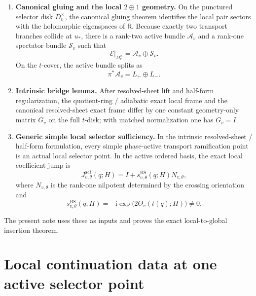 \documentclass[11pt]{article}
\numberwithin{equation}{section}
\theoremstyle{definition}
\newcommand{\ii}{\mathrm i}
\newcommand{\E}{\mathcal E}
\newcommand{\Rop}{\mathsf R}
\newcommand{\Aact}{\mathcal A_v}
\newcommand{\Ssp}{\mathcal S_v}
\newcommand{\Jact}{J^{\mathrm{act}}_{v,\theta}}
\begin{document}
\begin{enumerate}
  \item \textbf{Canonical gluing and the local $2\oplus 1$ geometry.} On the punctured selector disk $D_v^\times$, the canonical gluing theorem identifies the local pair sectors with the holomorphic eigenspaces of $\Rop$. Because exactly two transport branches collide at $u_*$, there is a rank-two active bundle $\Aact$ and a rank-one spectator bundle $\Ssp$ such that
  \begin{equation}
  \label{eq:2plus1-splitting}
  \E\big|_{D_v^\times}=\Aact\oplus \Ssp.
  \end{equation}
  On the $t$-cover, the active bundle splits as
  \begin{equation}
  \label{eq:active-splitting}
  \pi^*\Aact=L_+\oplus L_-.
  \end{equation}

  \item \textbf{Intrinsic bridge lemma.} After resolved-sheet lift and half-form regularization, the quotient-ring / adiabatic exact local frame and the canonical resolved-sheet exact frame differ by one constant geometry-only matrix $G_v$ on the full $t$-disk; with matched normalization one has $G_v=I$.

  \item \textbf{Generic simple local selector sufficiency.} In the intrinsic resolved-sheet / half-form formulation, every simple phase-active transport ramification point is an actual local selector point. In the active ordered basis, the exact local coefficient jump is
  \begin{equation}
  \label{eq:active-local-jump}
  \Jact(q;H)=I+s^{\mathrm{BS}}_{v,\theta}(q;H)N_{v,\theta},
  \end{equation}
  where $N_{v,\theta}$ is the rank-one nilpotent determined by the crossing orientation and
  \begin{equation}
  \label{eq:svbs}
  s^{\mathrm{BS}}_{v,\theta}(q;H)=-\ii\exp\bigl(2\Theta_v(t(q);H)\bigr)\neq 0.
  \end{equation}
\end{enumerate}

The present note uses these as inputs and proves the exact local-to-global insertion theorem.

\section{Local continuation data at one active selector point}
\end{document}
